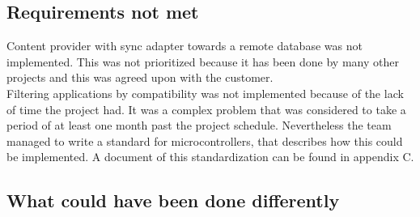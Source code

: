		\subsection{Requirements not met}
			Content provider with sync adapter towards a remote database was not implemented. This was not prioritized because it has been done by many other projects and this was agreed upon with the customer. \\

			Filtering applications by compatibility was not implemented because of the lack of time the project had. It was a complex problem that was considered to take a period of at least one month past the project schedule. Nevertheless the team managed to write a standard for microcontrollers, that describes how this could be implemented. A document of this standardization can be found in appendix C. \\

		\subsection{What could have been done differently}
